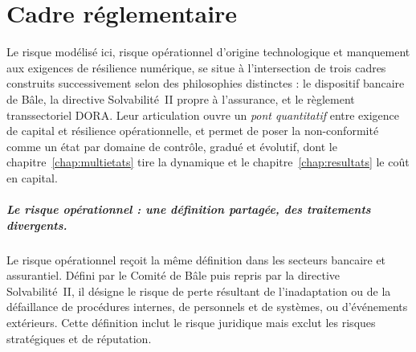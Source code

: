 \chapter{Cadre réglementaire}
\label{chap:reglementaire}



Le risque modélisé ici, risque opérationnel d'origine technologique et manquement aux
exigences de résilience numérique, se situe à l'intersection de trois cadres construits
successivement selon des philosophies distinctes : le dispositif bancaire de Bâle, la directive
Solvabilité~II propre à l'assurance, et le règlement transsectoriel DORA. Leur articulation
ouvre un \emph{pont quantitatif} entre exigence de capital et résilience opérationnelle, et
permet de poser la non-conformité comme un état par domaine de contrôle, gradué et évolutif,
dont le chapitre~\ref{chap:multietats} tire la dynamique et le chapitre~\ref{chap:resultats}
le coût en capital.



\paragraph{Le risque opérationnel : une définition partagée, des traitements divergents.}
Le risque opérationnel reçoit la même définition dans les secteurs bancaire et
assurantiel. Défini par le Comité de Bâle puis repris par la directive Solvabilité~II,
il désigne le risque de perte résultant de l'inadaptation ou de la défaillance de
procédures internes, de personnels et de systèmes, ou d'événements extérieurs. Cette
définition inclut le risque juridique mais exclut les risques stratégiques et de
réputation.

